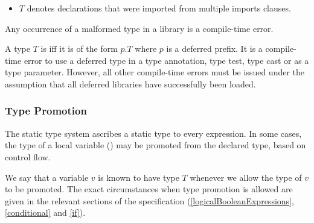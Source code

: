 \documentclass[makeidx]{article}
\begin{document}
{\begin{itemize}


  \noindent
  or of the form



  \noindent
  where each $x_j$ which is not a named parameter may be omitted,
  and $T_j$ is malformed for some $j \in 0 .. n$,
  or $B_j$ is malformed for some $j \in 1 .. m$.
\item
  $T$ denotes declarations that were imported from multiple imports clauses.
\end{itemize}

\LMHash{}%
Any occurrence of a malformed type in a library is a compile-time error.

\LMHash{}%
A type $T$ is 
if{}f it is of the form $p.T$ where $p$ is a deferred prefix.
It is a compile-time error to use a deferred type
in a type annotation, type test, type cast or as a type parameter.
However, all other compile-time errors must be issued
under the assumption that all deferred libraries have successfully been loaded.



\subsubsection{Type Promotion}

\LMHash{}%
The static type system ascribes a static type to every expression.
In some cases, the type of a local variable
()
may be promoted from the declared type, based on control flow.

\LMHash{}%
We say that a variable $v$ is known to have type $T$
whenever we allow the type of $v$ to be promoted.
The exact circumstances when type promotion is allowed are given in
the relevant sections of the specification
(\ref{logicalBooleanExpressions}, \ref{conditional} and \ref{if}).

}
\end{document}
